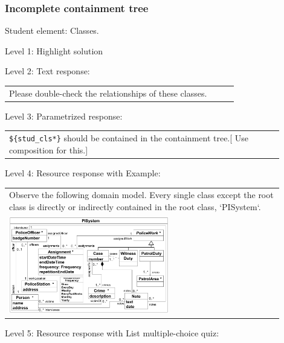 \subsubsection{Incomplete containment tree}

Student element: Classes.  \medskip

\noindent Level 1: Highlight solution  \medskip

\noindent Level 2: Text response: \medskip

\begin{tabular}{|p{0.9\linewidth}}
Please double-check the relationships of these classes.
\end{tabular} \medskip

\noindent Level 3: Parametrized response: \medskip

\begin{tabular}{|p{0.9\linewidth}}
\verb|${stud_cls*}| should be contained in the containment tree.[ Use composition for this.]
\end{tabular} \medskip

\noindent Level 4: Resource response with Example: \medskip

\begin{tabular}{|p{0.9\linewidth}}
Observe the following domain model. Every single class except the root class is directly or
indirectly contained in the root class, `PISystem`.

\\
\includegraphics[width=0.6\textwidth]{images/PISystem.png}
\end{tabular} \medskip

\noindent Level 5: Resource response with List multiple-choice quiz: \medskip

